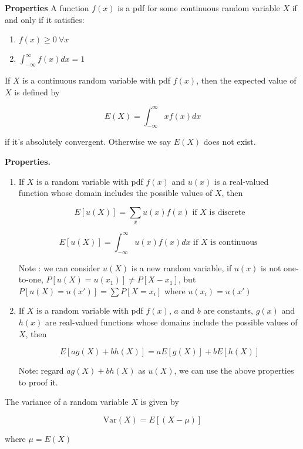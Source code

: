 \textbf{Properties} A function $f(x)$ is a pdf for some continuous random variable $X$ if and only if it satisfies:

\begin{enumerate}[label = $(\roman*$)]
	\item $f(x) \geq 0 ~\forall x$
	\item $\int^{\infty}_{-\infty}f(x)dx = 1$  
\end{enumerate}

\begin{defn}
	If $X$ is a continuous random variable with pdf $f(x)$, then the expected value of $X$ is defined by
	
	$$E(X) = \int^{\infty}_{-\infty}xf(x)dx$$
	
	if it's absolutely convergent. Otherwise we say $E(X)$ does not exist.
\end{defn}

\textbf{Properties.}

\begin{enumerate}[wide,label = $\bullet$]
	\item If $X$ is a random variable with pdf $f(x)$ and $u(x)$ is a real-valued function whose domain includes the possible values of $X$, then 
	
	$$E[u(X)] = \sum_{x}u(x)f(x) \text{ if $X$ is discrete}$$
	
	$$E[u(X)] = \int^{\infty}_{-\infty}u(x)f(x)dx \text{ if $X$ is continuous }$$
	
	Note : we can consider $u(X)$ is a new random variable, if $u(x)$ is not one-to-one, $P[u(X) = u(x_1)] \neq P[X - x_1]$, but $P[u(X) = u(x')] = \sum P[X = x_i]$ where $u(x_i) = u(x')$
	\item If $X$ is a random variable with pdf $f(x)$, $a$ and $b$ are constants,  $g(x)$ and $h(x)$ are real-valued functions whose domains include the possible values of $X$, then 
	
	$$E[ag(X) + bh(X)] = aE[g(X)]+bE[h(X)]$$
	
	Note: regard $ag(X) + bh(X)$ as $u(X)$, we can use the above properties to proof it.
\end{enumerate}

\newpage

\begin{defn}
	The variance of a random variable $X$ is given by 
	
	$$\text{Var}(X) = E[(X-\mu)]$$
	
	where $\mu = E(X)$
\end{defn}

